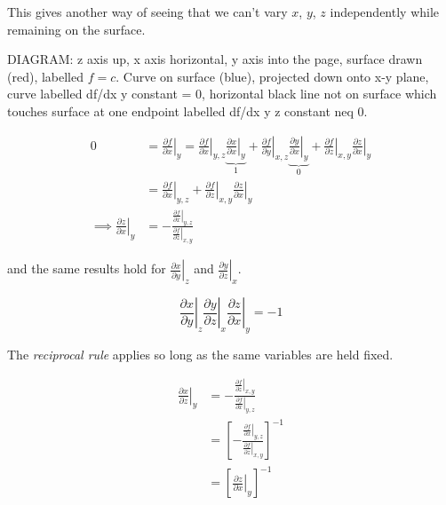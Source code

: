 \documentclass{../template/note}
\begin{document}
    This gives another way of seeing that we can't vary \(x\), \(y\), \(z\) independently while remaining on the surface.

    DIAGRAM: z axis up, x axis horizontal, y axis into the page, surface drawn (red), labelled \(f = c\). Curve on surface (blue), projected down onto x-y plane, curve labelled df/dx y constant = 0, horizontal black line not on surface which touches surface at one endpoint labelled df/dx y z constant neq 0.

    \begin{align*}
        0 & = \left.\frac{\partial f}{\partial x}\right|_y = \left.\frac{\partial f}{\partial x}\right|_{y, z} \underbrace{\left.\frac{\partial x}{\partial x}\right|_{y}}_{1} + \left.\frac{\partial f}{\partial y}\right|_{x, z} \underbrace{\left.\frac{\partial y}{\partial x}\right|_{y}}_{0} + \left.\frac{\partial f}{\partial z}\right|_{x, y} \left.\frac{\partial z}{\partial x}\right|_{y} \\
        &= \left.\frac{\partial f}{\partial x}\right|_{y, z} + \left.\frac{\partial f}{\partial z}\right|_{x, y} \left.\frac{\partial z}{\partial x}\right|_{y} \\
        \implies \left.\frac{\partial z}{\partial x}\right|_{y} &= -\frac{\left.\frac{\partial f}{\partial x}\right|_{y, z}}{\left.\frac{\partial f}{\partial z}\right|_{x, y}}
    \end{align*}
    
    and the same results hold for \(\left.\frac{\partial x}{\partial y}\right|_{z}\) and \(\left.\frac{\partial y}{\partial z}\right|_{x}\).

    \begin{proposition}
        \[
            \left.\frac{\partial x}{\partial y}\right|_{z} \left.\frac{\partial y}{\partial z}\right|_{x} \left.\frac{\partial z}{\partial x}\right|_{y} = -1
        \]
    \end{proposition}
    
    The \emph{reciprocal rule} applies so long as the same variables are held fixed.

    \begin{align*}
        \left.\frac{\partial x}{\partial z}\right|_{y} &= -\frac{\left.\frac{\partial f}{\partial z}\right|_{x, y}}{\left.\frac{\partial f}{\partial x}\right|_{y, z}} \\
        &= \left[-\frac{\left.\frac{\partial f}{\partial x}\right|_{y, z}}{\left.\frac{\partial f}{\partial z}\right|_{x, y}}\right]^{-1} \\
        &= \left[\left.\frac{\partial z}{\partial x}\right|_{y}\right]^{-1}
    \end{align*}
    
\end{document}
